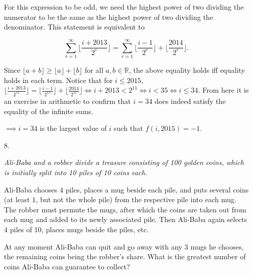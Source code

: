 \documentclass{article}
\begin{document}
\begin{enumerate}
For this expression to be odd, we need the highest power of two dividing the numerator to be the same as the highest power of two dividing the denominator. This statement is equivalent to

$$\sum_{r = 1}^{\infty} \lfloor{\frac{i + 2013}{2^r}}\rfloor = \sum_{r = 1}^{\infty}\lfloor \frac{i - 1}{2^r} \rfloor + \lfloor \frac{2014}{2^r} \rfloor.$$

Since $\lfloor a + b \rfloor \ge \lfloor a \rfloor + \lfloor b \rfloor$ for all $a, b \in \mathbb{R}$, the above equality holds iff equality holds in each term. Notice that for $i \le 2015$, $\lfloor \frac{i + 2013}{2^{11}} \rfloor = \lfloor \frac{i - 1}{2^{11}} \rfloor + \lfloor \frac{2014}{2^{11}} \rfloor \iff i + 2013 < 2^{11} \iff i < 35 \iff i \le 34$. From here it is an exercise in arithmetic to confirm that $i = 34$ does indeed satisfy the equality of the infinite sums.

$\implies i = 34$ is the largest value of $i$ such that $f(i, 2015) = -1$.

\medskip
\item[8.] %
{\itshape Ali-Baba and a robber divide a treasure consisting of 100 golden coins, which is initially split into 10 piles of 10 coins each.

Ali-Baba chooses 4 piles, places a mug beside each pile, and puts several coins (at least $1$, but not the whole pile) from the respective pile into each mug.
The robber must permute the mugs, after which the coins are taken out from each mug and added to its newly associated pile.
Then Ali-Baba again selects 4 piles of 10, places mugs beside the piles, etc.

At any moment Ali-Baba can quit and go away with any 3 mugs he chooses, the remaining coins being the robber's share.
What is the greatest number of coins Ali-Baba can guarantee to collect?}


\end{enumerate}
\end{document}
